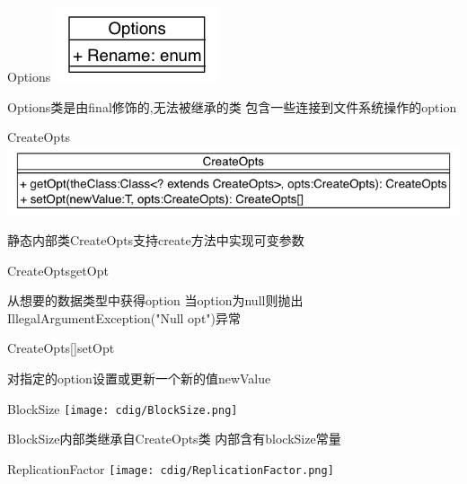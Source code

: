 \begin{XeClass}{Options}
\includegraphics[width=\textwidth]{cdig/Options.png}
     
 Options类是由final修饰的,无法被继承的类
 包含一些连接到文件系统操作的option

    \begin{XeInnerClass}{CreateOpts}
\includegraphics[width=\textwidth]{cdig/CreateOpts.png}
         
 静态内部类CreateOpts支持create方法中实现可变参数

        \begin{XeMethod}{\XeProtected}{CreateOpts}{getOpt}
             
 从想要的数据类型中获得option
 当option为null则抛出IllegalArgumentException("Null opt")异常

        \end{XeMethod}

        \begin{XeMethod}{\XeProtected}{CreateOpts[]}{setOpt}
             
 对指定的option设置或更新一个新的值newValue

        \end{XeMethod}

        \begin{XeInnerClass}{BlockSize}
\texttt{[image: cdig/BlockSize.png]}
             
 BlockSize内部类继承自CreateOpts类
 内部含有blockSize常量

        \end{XeInnerClass}
        \begin{XeInnerClass}{ReplicationFactor}
\texttt{[image: cdig/ReplicationFactor.png]}
             

\end{XeInnerClass}
\end{XeInnerClass}
\end{XeClass}
